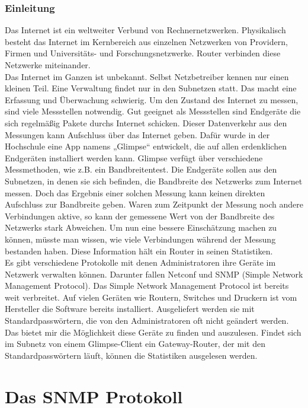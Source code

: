 \documentclass[11pt,a4paper]{article}
\begin{document}
\section{Einleitung}
Das Internet ist ein weltweiter Verbund von Rechnernetzwerken. Physikalisch besteht das Internet im Kernbereich aus einzelnen Netzwerken von Providern, Firmen und Universitäts- und Forschungsnetzwerke. Router verbinden diese Netzwerke miteinander.\\
Das Internet im Ganzen ist unbekannt. Selbst Netzbetreiber kennen nur einen kleinen Teil. Eine Verwaltung findet nur in den Subnetzen statt. Das macht eine Erfassung und Überwachung schwierig. Um den Zustand des Internet zu messen, sind viele Messstellen notwendig. Gut geeignet als Messstellen sind Endgeräte die sich regelmäßig Pakete durchs Internet schicken. Dieser Datenverkehr aus den Messungen kann Aufschluss über das Internet geben. Dafür wurde in der Hochschule eine App namens „Glimpse“ entwickelt, die auf allen erdenklichen Endgeräten installiert werden kann.
Glimpse verfügt über verschiedene Messmethoden, wie z.B. ein Bandbreitentest. Die Endgeräte sollen aus den Subnetzen, in denen sie sich befinden, die Bandbreite des Netzwerks zum Internet messen. Doch das Ergebnis einer solchen Messung kann keinen direkten Aufschluss zur Bandbreite geben. Waren zum Zeitpunkt der Messung noch andere Verbindungen aktive, so kann der gemessene Wert von der Bandbreite des Netzwerks stark Abweichen. Um nun eine bessere Einschätzung machen zu können, müsste man wissen, wie viele Verbindungen während der Messung bestanden haben. Diese Information hält ein Router in seinen Statistiken.\\
Es gibt verschiedene Protokolle mit denen Administratoren ihre Geräte im Netzwerk verwalten können. Darunter fallen Netconf und SNMP (Simple Network Management Protocol). Das Simple Network Management Protocol ist bereits weit verbreitet. Auf vielen Geräten wie Routern, Switches und Druckern ist vom Hersteller die Software bereits installiert. Ausgeliefert werden sie mit Standardpasswörtern, die von den Administratoren oft nicht geändert werden. Das bietet mir die Möglichkeit diese Geräte zu finden und auszulesen.
Findet sich im Subnetz von einem Glimpse-Client ein Gateway-Router, der mit den Standardpasswörtern läuft, können die Statistiken ausgelesen werden.
\pagebreak

\part{Das SNMP Protokoll}
\end{document}
